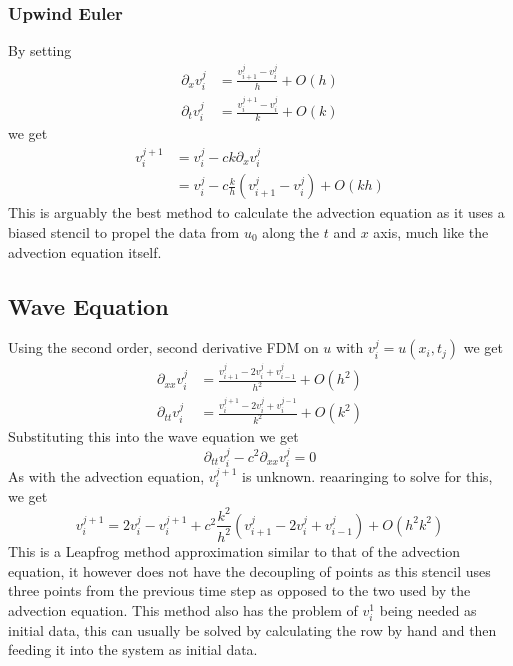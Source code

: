\subsubsection{Upwind Euler}
By setting
\begin{equation}
\begin{align}
    \partial_xv_i^j &= \frac{v_{i+1}^j - v_i^j}{h} + O(h) \\
    \partial_tv_i^j &= \frac{v_i^{j+1} - v_i^j}{k} + O(k)
\end{align}
\end{equation}
we get
\begin{equation}
\begin{align}
    v_i^{j+1} &= v_i^j - ck\partial_xv_i^j \\
	      &= v_i^j - c\frac{k}{h}(v_{i+1}^j - v_i^j) + O(kh)
\end{align}
\end{equation}
This is arguably the best method to calculate the advection equation as it uses a biased stencil to propel the data from $u_0$ along the $t$ and $x$ axis, much like the advection equation itself.
\subsection{Wave Equation}
Using the second order, second derivative FDM on $u$ with $v_i^j = u(x_i,t_j)$ we get
\begin{equation}
\begin{align}
    \partial_{xx}v_i^j &= \frac{v_{i+1}^j - 2v_i^j + v_{i-1}^j}{h^2} + O(h^2) \\
    \partial_{tt}v_i^j &= \frac{v_i^{j+1} - 2v_i^j + v_i^{j-1}}{k^2} + O(k^2)
\end{align}
\end{equation}
Substituting this into the wave equation we get
\begin{equation}
  \partial_{tt}v_i^j - c^2\partial_{xx}v_i^j = 0
\end{equation}
As with the advection equation, $v_i^{j+1}$ is unknown. reaaringing to solve for this, we get
\begin{equation}
  v_i^{j+1} = 2v_i^j - v_i^{j+1} + c^2\frac{k^2}{h^2}(v_{i+1}^j - 2v_i^j + v_{i-1}^j) + O(h^2k^2)
\end{equation}
This is a Leapfrog method approximation similar to that of the advection equation, it however does not have the decoupling of points as this stencil uses three points from the previous time step as opposed to the two used by the advection equation. This method also has the problem of $v_i^1$ being needed as initial data, this can usually be solved by calculating the row by hand and then feeding it into the system as initial data.
